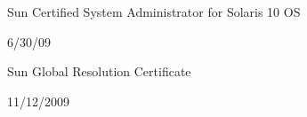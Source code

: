 \documentclass[10pt]{article}
\renewcommand{\section}[2]%
        {\pagebreak[2]\vspace{1.4\baselineskip}%
         \phantomsection\addcontentsline{toc}{section}{#1}%
         \hspace{0in}%
         \marginpar{
         \raggedright \scshape #1}#2}
\newcommand{\blankline}{\quad\pagebreak[2]}
\begin{document}
Sun Certified System Administrator for Solaris 10 OS


6/30/09

\blankline

Sun Global Resolution Certificate


11/12/2009

\end{document}
